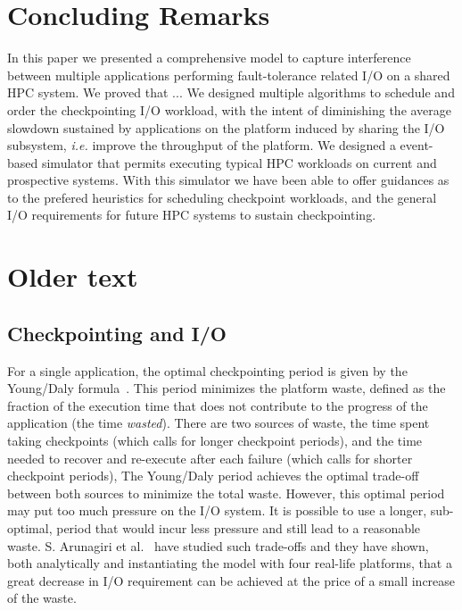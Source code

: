 \documentclass[conference]{IEEEtran}
\newcommand{\ie}[0]{\emph{i.e.}\xspace}
\begin{document}
\section{Concluding Remarks}\label{sec:conclusion}

In this paper we presented a comprehensive model to capture interference
between multiple applications performing fault-tolerance related I/O
on a shared HPC system. We proved that ... We designed multiple algorithms
to schedule and order the checkpointing I/O workload, with the intent of
diminishing the average slowdown sustained by applications on the
platform induced by sharing the I/O subsystem, \ie improve the throughput
of the platform. We designed a event-based simulator that permits
executing typical HPC workloads on current and prospective systems.
With this simulator we have been able to offer guidances as to the
prefered heuristics for scheduling checkpoint workloads, and the
general I/O requirements for future HPC systems to sustain checkpointing.







\newpage
\appendix
\section{Older text}



\subsection{Checkpointing and I/O}

For a single application, the optimal checkpointing period is given by the Young/Daly
formula~\cite{young74,daly04}. This period minimizes the platform waste, defined as
the fraction of the
execution time that does not contribute to the progress of the application (the
time \emph{wasted}).  There are two sources of waste, the time spent taking checkpoints
(which calls for longer checkpoint periods),
and the time needed to recover and re-execute after each failure
(which calls for shorter checkpoint periods),
The Young/Daly
period achieves the optimal trade-off between both sources to minimize the
total waste.
However, this optimal period may put too much pressure
on the I/O system. It is possible to use a longer, sub-optimal, period that would incur
less pressure and still lead to a reasonable waste. S. Arunagiri et al.~\cite{Arunagiri2009} have studied such trade-offs and they have shown, both analytically and instantiating the model with four real-life platforms,
that a great decrease in I/O requirement can be achieved  at the price of a small increase of the waste.
\end{document}
